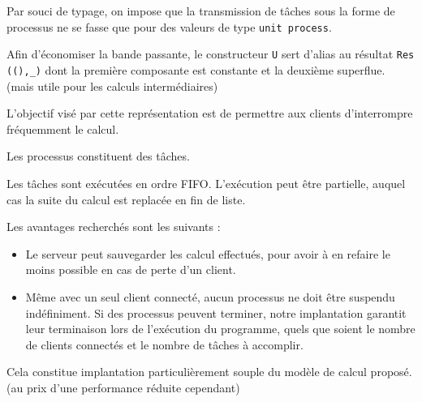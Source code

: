 \documentclass[11pt]{article}
\begin{document}
Par souci de typage, on impose que la transmission de
t\^aches sous la forme de processus ne se fasse que pour des valeurs
de type {\tt unit process}.

Afin d'\'economiser la bande passante,
le constructeur {\tt U} sert d'alias au r\'esultat {\tt Res ((),\_)}
dont la premi\`ere composante est constante et la deuxi\`eme superflue.
(mais utile pour les calculs interm\'ediaires)

\smallskip

L'objectif vis\'e par cette repr\'esentation est
de permettre aux clients d'interrompre fr\'equemment le calcul.

Les processus constituent des t\^aches.

Les t\^aches sont ex\'ecut\'ees en ordre FIFO.
L'ex\'ecution peut \^etre partielle,
auquel cas la suite du calcul est replac\'ee en fin de liste.

\smallskip

Les avantages recherch\'es sont les suivants :

\begin{itemize}
  \item Le serveur peut sauvegarder les calcul effectu\'es,
    pour avoir \`a en refaire le moins possible en cas de perte d'un client.
  \item M\^eme avec un seul client connect\'e,
    aucun processus ne doit \^etre suspendu ind\'efiniment.
    Si des processus peuvent terminer, notre implantation garantit leur
    terminaison lors de l'ex\'ecution du programme, quels que soient
    le nombre de clients connect\'es et le nombre de t\^aches \`a accomplir.
\end{itemize}

Cela constitue implantation particuli\`erement souple
du mod\`ele de calcul propos\'e.
(au prix d'une performance r\'eduite cependant)
\end{document}
